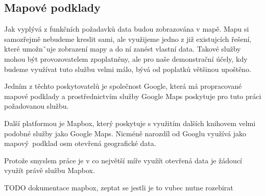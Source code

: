 \subsection{Mapové podklady}

Jak vyplývá z funkčních požadavků data budou zobrazována v mapě. Mapu si samozřejmě nebudeme kreslit sami, ale využijeme jedno z již existujcích řešení, které umožnˇuje zobrazení mapy a do ní zanést vlastní data. Takové služby mohou být provozovatelem zpoplatněny, ale pro naše demonstrační účely, kdy budeme využívat tuto službu velmi málo, bývá od poplatků většinou upoštěno.

\bigbreak

Jedním z těchto poskytovatelů je společnost Google, která má propracované mapové podklady a prostřednictvím služby Google Maps poskytuje pro tuto práci požadovanou službu.

\bigbreak

Další platformou je Mapbox, který poskytuje s využitím dalších knihovem velmi podobné služby jako Google Maps. Nicméně narozdíl od Googlu využívá jako mapový podklad \gls{osm} {otevřená geografické data}.

\bigbreak

Protože smyslem práce je v co největší míře využít otevřená data je žádoucí využít právě službu Mapbox.

\bigbreak

TODO dokumentace mapbox, zeptat se jestli je to vubec nutne rozebirat
